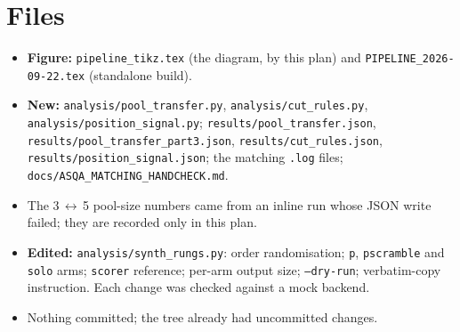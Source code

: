 \documentclass[11pt]{article}
\newcommand{\code}[1]{\texttt{#1}}
\begin{document}
\section{Files}
\begin{itemize}
  \item \textbf{Figure:} \code{pipeline\_tikz.tex} (the diagram, \verb|| by
        this plan) and \code{PIPELINE\_2026-09-22.tex} (standalone build).
  \item \textbf{New:} \code{analysis/pool\_transfer.py}, \code{analysis/cut\_rules.py},
        \code{analysis/position\_signal.py}; \code{results/pool\_transfer.json},
        \code{results/pool\_transfer\_part3.json}, \code{results/cut\_rules.json},
        \code{results/position\_signal.json}; the matching \code{.log} files;
        \code{docs/ASQA\_MATCHING\_HANDCHECK.md}.
  \item The 3\,$\leftrightarrow$\,5 pool-size numbers came from an inline run
        whose JSON write failed; they are recorded only in this plan.
  \item \textbf{Edited:} \code{analysis/synth\_rungs.py}: order randomisation;
        \code{p}, \code{pscramble} and \code{solo} arms; \code{scorer} reference;
        per-arm output size; \code{--dry-run}; verbatim-copy instruction. Each
        change was checked against a mock backend.
  \item Nothing committed; the tree already had uncommitted changes.
\end{itemize}
\end{document}
